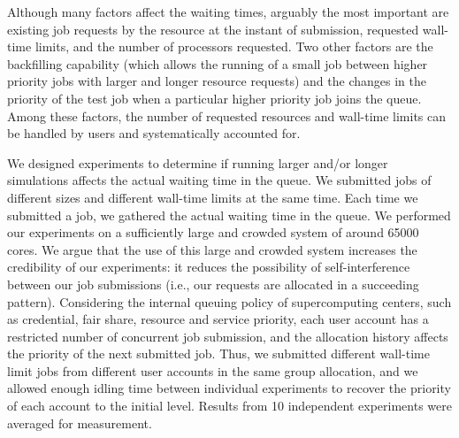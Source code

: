 \documentclass[preprint,12pt]{elsarticle}
\begin{document}
Although many factors affect the waiting times, arguably the most important are existing job requests by the resource at the instant of submission, requested wall-time limits, and the number of processors requested. Two other factors are the backfilling capability (which allows the running of a small job between higher priority jobs with larger and longer resource requests) and the changes in the priority of the test job when a particular higher priority job joins the queue. Among these factors, the number of requested resources and wall-time limits can be handled by users and systematically accounted for.


We designed experiments to determine if running larger and/or longer simulations affects the actual waiting time in the queue. We submitted jobs of different sizes and different wall-time limits at the same time. Each time we submitted a job, we gathered the actual waiting time in the queue. We performed our experiments on a sufficiently large and crowded system of around 65000 cores. We argue that the use of this large and crowded system increases the credibility of our experiments: it reduces the possibility of self-interference between our job submissions (i.e., our requests are allocated in a succeeding pattern). Considering the internal queuing policy of supercomputing centers, such as credential, fair share, resource and service priority, each user account has a restricted number of concurrent job submission, and the allocation history affects the priority of the next submitted job. Thus, we submitted different wall-time limit jobs from different user accounts in the same group allocation, and we allowed enough idling time between individual experiments to recover the priority of each account to the initial level. Results from 10 independent experiments were averaged for measurement.
\end{document}
